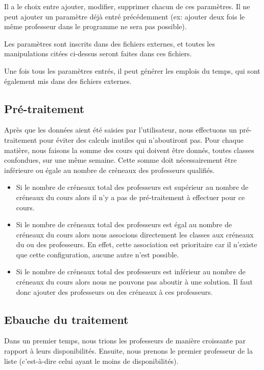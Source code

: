 \documentclass[12pt,a4paper,french]{article}
\begin{document}
Il a le choix entre ajouter, modifier, supprimer chacun de ces paramètres. Il ne peut ajouter un paramètre déjà entré précédemment (ex: ajouter deux fois le même professeur dans le programme ne sera pas possible).

Les paramètres sont inscrits dans des fichiers externes, et toutes les manipulations citées ci-dessus seront faites dans ces fichiers. 

Une fois tous les paramètres entrés, il peut générer les emplois du temps, qui sont également mis dans des fichiers externes.

\subsection{Pré-traitement}
Après que les données aient été saisies par l'utilisateur, nous effectuons un pré-traitement pour éviter des calculs inutiles qui n'aboutiront pas. Pour chaque matière, nous faisons la somme des cours qui doivent être donnés, toutes classes confondues, sur une même semaine. Cette somme doit nécessairement être inférieure ou égale au nombre de créneaux des professeurs qualifiés.

\begin{itemize}
\item Si le nombre de créneaux total des professeurs est supérieur au nombre de créneaux du cours alors il n'y a pas de pré-traitement à effectuer pour ce cours.
\item Si le nombre de créneaux total des professeurs est égal au nombre de créneaux du cours alors nous associons directement les classes aux créneaux du ou des professeurs. En effet, cette association est prioritaire car il n'existe que cette configuration, aucune autre n'est possible.
\item Si le nombre de créneaux total des professeurs est inférieur au nombre de créneaux du cours alors nous ne pouvons pas aboutir à une solution. Il faut donc ajouter des professeurs ou des créneaux à ces professeurs.
\end{itemize}

\subsection{Ebauche du traitement}
Dans un premier temps, nous trions les professeurs de manière croissante par rapport à leurs disponibilités. Ensuite, nous prenons le premier professeur de la liste (c'est-à-dire celui ayant le moins de disponibilités). 
\end{document}
